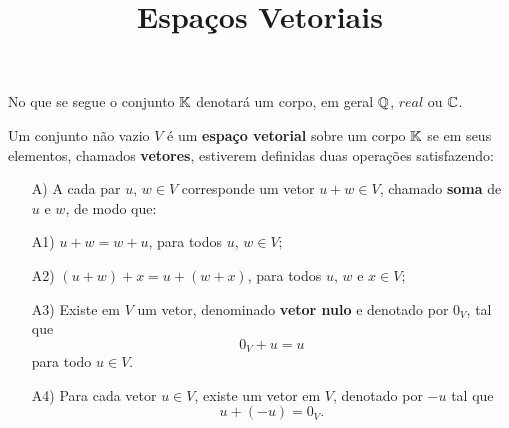 \documentclass{beamer}
\title{Espaços Vetoriais}
\author[\autor]{\autor}
\institute[\instituto]{\instituto}
\date{}
\begin{document}
    \begin{frame}
        \maketitle
    \end{frame}


    \begin{frame}
        No que se segue o conjunto $\mathbb{K}$ denotar\'a um corpo, em geral $\mathbb{Q}$, $real$ ou $\mathbb{C}$.

        \begin{definicao}
    	    Um conjunto	n\~ao vazio $V$ \'e um \textbf{espa\c{c}o vetorial} sobre um corpo $\mathbb{K}$ se em seus elementos, chamados \textbf{vetores}, estiverem definidas duas opera\c{c}\~oes satisfazendo:
    	    \begin{itemize}
        		\item[A)] A cada par $u$, $w \in V$ corresponde um vetor $u + w \in V$, chamado \textbf{soma} de $u$ e $w$, de modo que:
		        \item[A1)] $u + w = w + u$, para todos $u$, $w \in V$;
	    	    \item[A2)] $(u + w) + x = u + (w + x)$, para todos $u$, $w$ e $x \in V$;
	    	\end{itemize}
	    \end{definicao}
	\end{frame}

	\begin{frame}
	    \begin{definicao}
	        \begin{itemize}
        		\item[A3)] Existe em $V$ um vetor, denominado \textbf{vetor nulo} e denotado por $0_V$, tal que
	    	    \[
	        		0_V + u = u
    		    \]
    		    para todo $u \in V$.
	        	\item[A4)] Para cada vetor $u \in V$, existe um vetor em $V$, denotado por $-u$ tal que
    	    	\[
		        	u + (-u) = 0_V.
    	    	\]
	    	\end{itemize}
	    \end{definicao}
	\end{frame}
\end{document}
